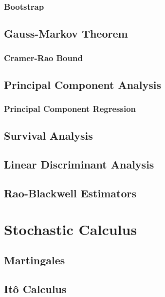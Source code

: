 \documentclass[11pt]{report} %
\begin{document}
\subsection{Bootstrap}



\section{Gauss-Markov Theorem}

\subsection{Cramer-Rao Bound}

\section{Principal Component Analysis}

\subsection{Principal Component Regression}

\section{Survival Analysis}

\section{Linear Discriminant Analysis}

\section{Rao-Blackwell Estimators}

\chapter{Stochastic Calculus}

\section{Martingales}

\section{It\^{o} Calculus}
\end{document}
